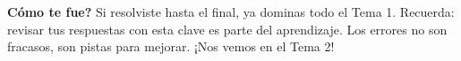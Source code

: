 \documentclass[12pt, letterpaper]{article}
\begin{document}
  \vspace{10pt}
  \begin{cuadrosolucion}
    \textbf{\textquestiondown Cómo te fue?} Si resolviste hasta el final, ya dominas todo el Tema 1. Recuerda: revisar tus respuestas con esta clave es parte del aprendizaje. Los errores no son fracasos, son pistas para mejorar. ¡Nos vemos en el Tema 2!
  \end{cuadrosolucion}

\fi
\end{document}
